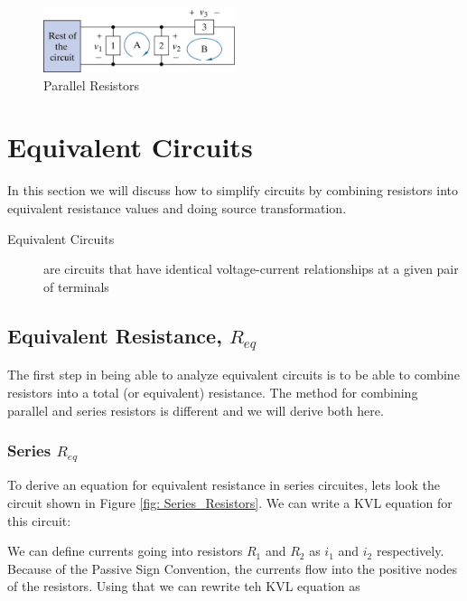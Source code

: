 \documentclass{handout}
\begin{document}
\begin{figure}[h t b]
\centering
\includegraphics[width=0.5\textwidth]{Parallel_Resistors.jpg}
\caption{Parallel Resistors}
\label{fig: Parallel_Resistors}
\end{figure}

\section{Equivalent Circuits}
In this section we will discuss how to simplify circuits by combining resistors into equivalent resistance values and doing source transformation.  

\begin{description}
\item [Equivalent Circuits] are circuits that have identical voltage-current relationships at a given pair of terminals
\end{description}

\subsection{Equivalent Resistance, $R_{eq}$}
The first step in being able to analyze equivalent circuits is to be able to combine resistors into a total (or equivalent) resistance.  The method for combining parallel and series resistors is different and we will derive both here.

\subsubsection{Series $R_{eq}$}
To derive an equation for equivalent resistance in series circuites, lets look the circuit shown in Figure \ref{fig: Series_Resistors}. We can write a KVL equation for this circuit:


We can define currents going into resistors $R_1$ and $R_2$ as $i_1$ and $i_2$ respectively.  Because of the Passive Sign Convention, the currents flow into the positive nodes of the resistors. Using that we can rewrite teh KVL equation as
\end{document}
